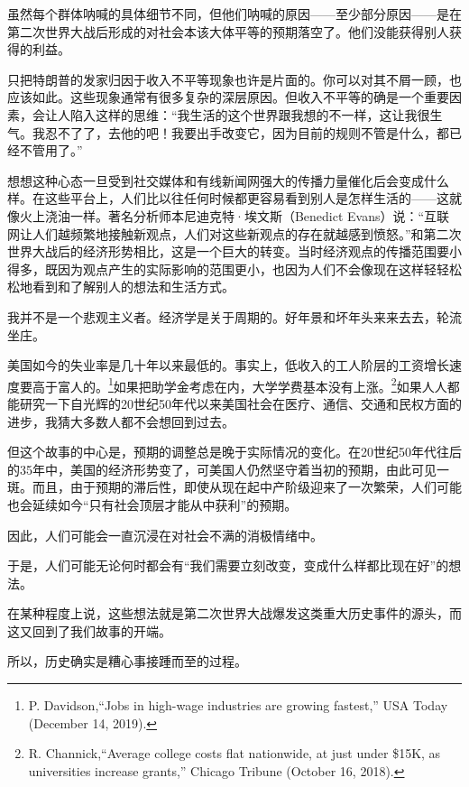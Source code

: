 

虽然每个群体呐喊的具体细节不同，但他们呐喊的原因——至少部分原因——是在第二次世界大战后形成的对社会本该大体平等的预期落空了。他们没能获得别人获得的利益。

只把特朗普的发家归因于收入不平等现象也许是片面的。你可以对其不屑一顾，也应该如此。这些现象通常有很多复杂的深层原因。但收入不平等的确是一个重要因素，会让人陷入这样的思维：“我生活的这个世界跟我想的不一样，这让我很生气。我忍不了了，去他的吧！我要出手改变它，因为目前的规则不管是什么，都已经不管用了。”

想想这种心态一旦受到社交媒体和有线新闻网强大的传播力量催化后会变成什么样。在这些平台上，人们比以往任何时候都更容易看到别人是怎样生活的——这就像火上浇油一样。著名分析师本尼迪克特·埃文斯（Benedict Evans）说：“互联网让人们越频繁地接触新观点，人们对这些新观点的存在就越感到愤怒。”和第二次世界大战后的经济形势相比，这是一个巨大的转变。当时经济观点的传播范围要小得多，既因为观点产生的实际影响的范围更小，也因为人们不会像现在这样轻轻松松地看到和了解别人的想法和生活方式。

我并不是一个悲观主义者。经济学是关于周期的。好年景和坏年头来来去去，轮流坐庄。

美国如今的失业率是几十年以来最低的。事实上，低收入的工人阶层的工资增长速度要高于富人的。\footnote{P. Davidson,“Jobs in high-wage industries are growing fastest,” USA Today (December 14, 2019).}如果把助学金考虑在内，大学学费基本没有上涨。\footnote{R. Channick,“Average college costs flat nationwide, at just under \$15K, as universities increase grants,” Chicago Tribune (October 16, 2018).}如果人人都能研究一下自光辉的20世纪50年代以来美国社会在医疗、通信、交通和民权方面的进步，我猜大多数人都不会想回到过去。

但这个故事的中心是，预期的调整总是晚于实际情况的变化。在20世纪50年代往后的35年中，美国的经济形势变了，可美国人仍然坚守着当初的预期，由此可见一斑。而且，由于预期的滞后性，即使从现在起中产阶级迎来了一次繁荣，人们可能也会延续如今“只有社会顶层才能从中获利”的预期。

因此，人们可能会一直沉浸在对社会不满的消极情绪中。

于是，人们可能无论何时都会有“我们需要立刻改变，变成什么样都比现在好”的想法。

在某种程度上说，这些想法就是第二次世界大战爆发这类重大历史事件的源头，而这又回到了我们故事的开端。

所以，历史确实是糟心事接踵而至的过程。
